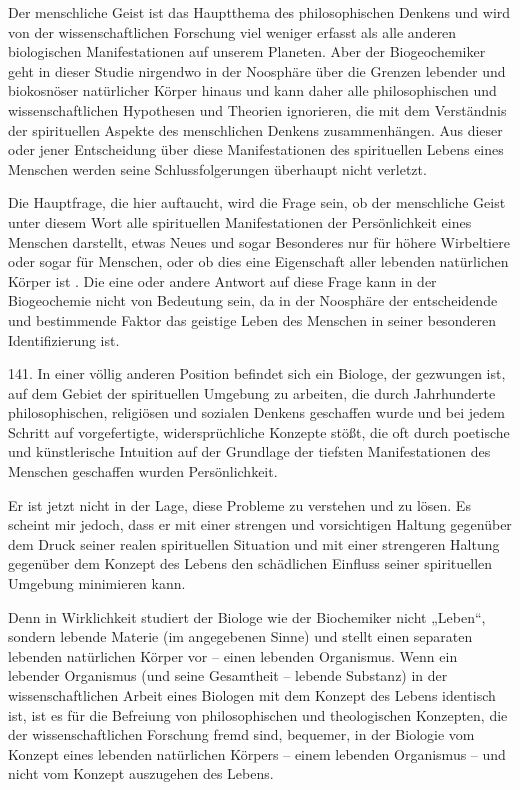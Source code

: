 \documentclass[11pt,a4paper]{book}
\begin{document}
Der menschliche Geist ist das Hauptthema des philosophischen Denkens und wird von der wissenschaftlichen Forschung viel weniger erfasst als alle anderen biologischen Manifestationen auf unserem Planeten. Aber der Biogeochemiker geht in dieser Studie nirgendwo in der Noosphäre über die Grenzen lebender und biokosnöser natürlicher Körper hinaus und kann daher alle philosophischen und wissenschaftlichen Hypothesen und Theorien ignorieren, die mit dem Verständnis der spirituellen Aspekte des menschlichen Denkens zusammenhängen. Aus dieser oder jener Entscheidung über diese Manifestationen des spirituellen Lebens eines Menschen werden seine Schlussfolgerungen überhaupt nicht verletzt.



Die Hauptfrage, die hier auftaucht, wird die Frage sein, ob der menschliche Geist unter diesem Wort alle spirituellen Manifestationen der Persönlichkeit eines Menschen darstellt, etwas Neues und sogar Besonderes nur für höhere Wirbeltiere oder sogar für Menschen, oder ob dies eine Eigenschaft aller lebenden natürlichen Körper ist . Die eine oder andere Antwort auf diese Frage kann in der Biogeochemie nicht von Bedeutung sein, da in der Noosphäre der entscheidende und bestimmende Faktor das geistige Leben des Menschen in seiner besonderen Identifizierung ist.



141. In einer völlig anderen Position befindet sich ein Biologe, der gezwungen ist, auf dem Gebiet der spirituellen Umgebung zu arbeiten, die durch Jahrhunderte philosophischen, religiösen und sozialen Denkens geschaffen wurde und bei jedem Schritt auf vorgefertigte, widersprüchliche Konzepte stößt, die oft durch poetische und künstlerische Intuition auf der Grundlage der tiefsten Manifestationen des Menschen geschaffen wurden Persönlichkeit.



Er ist jetzt nicht in der Lage, diese Probleme zu verstehen und zu lösen. Es scheint mir jedoch, dass er mit einer strengen und vorsichtigen Haltung gegenüber dem Druck seiner realen spirituellen Situation und mit einer strengeren Haltung gegenüber dem Konzept des Lebens den schädlichen Einfluss seiner spirituellen Umgebung minimieren kann.



Denn in Wirklichkeit studiert der Biologe wie der Biochemiker nicht „Leben“, sondern lebende Materie (im angegebenen Sinne) und stellt einen separaten lebenden natürlichen Körper vor -- einen lebenden Organismus. Wenn ein lebender Organismus (und seine Gesamtheit -- lebende Substanz) in der wissenschaftlichen Arbeit eines Biologen mit dem Konzept des Lebens identisch ist, ist es für die Befreiung von philosophischen und theologischen Konzepten, die der wissenschaftlichen Forschung fremd sind, bequemer, in der Biologie vom Konzept eines lebenden natürlichen Körpers -- einem lebenden Organismus -- und nicht vom Konzept auszugehen des Lebens.
\end{document}
